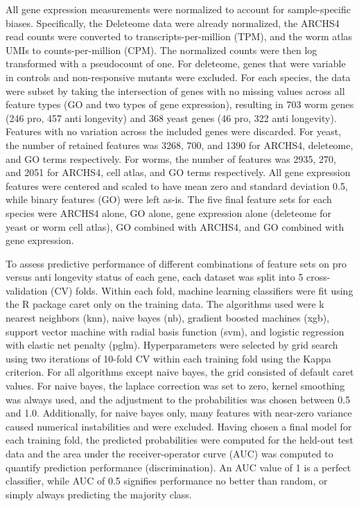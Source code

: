 \documentclass{article}
\begin{document}
All gene expression measurements were normalized to account for sample-specific biases. Specifically, the Deleteome data were already normalized, the ARCHS4 read counts were converted to transcripts-per-million (TPM), and the worm atlas UMIs to counts-per-million (CPM). The normalized counts were then log transformed with a pseudocount of one. For deleteome, genes that were variable in controls and non-responsive mutants were excluded. For each species, the data were subset by taking the intersection of genes with no missing values across all feature types (GO and two types of gene expression), resulting in 703 worm genes (246 pro, 457 anti longevity) and 368 yeast genes (46 pro, 322 anti longevity). Features with no variation across the included genes were discarded. For yeast, the number of retained features was 3268, 700, and 1390 for ARCHS4, deleteome, and GO terms respectively. For worms, the number of features was 2935, 270, and 2051 for ARCHS4, cell atlas, and GO terms respectively. All gene expression features were centered and scaled to have mean zero and standard deviation 0.5, while binary features (GO) were left as-is. The five final feature sets for each species were ARCHS4 alone, GO alone, gene expression alone (deleteome for yeast or worm cell atlas), GO combined with ARCHS4, and GO combined with gene expression.

To assess predictive performance of different combinations of feature sets on pro versus anti longevity status of each gene, each dataset was split into 5 cross-validation (CV) folds. Within each fold, machine learning classifiers were fit using the R package caret only on the training data. The algorithms used were k nearest neighbors (knn), naive bayes (nb), gradient boosted machines (xgb), support vector machine with radial basis function (svm), and logistic regression with elastic net penalty (pglm). Hyperparameters were selected by grid search using two iterations of 10-fold CV within each training fold using the Kappa criterion. For all algorithms except naive bayes, the grid consisted of default caret values. For naive bayes, the laplace correction was set to zero, kernel smoothing was always used, and the adjustment to the probabilities was chosen between 0.5 and 1.0. Additionally, for naive bayes only, many features with near-zero variance caused numerical instabilities and were excluded. Having chosen a final model for each training fold, the predicted probabilities were computed for the held-out test data and the area under the receiver-operator curve (AUC) was computed to quantify prediction performance (discrimination). An AUC value of 1 is a perfect classifier, while AUC of 0.5 signifies performance no better than random, or simply always predicting the majority class.
\end{document}

